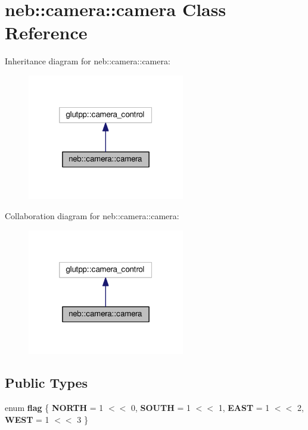 \hypertarget{classneb_1_1camera_1_1camera}{\section{neb\-:\-:camera\-:\-:camera Class Reference}
\label{classneb_1_1camera_1_1camera}
}


Inheritance diagram for neb\-:\-:camera\-:\-:camera\-:
\nopagebreak
\begin{figure}[H]
\begin{center}
\leavevmode
\includegraphics[width=194pt]{classneb_1_1camera_1_1camera__inherit__graph}
\end{center}
\end{figure}


Collaboration diagram for neb\-:\-:camera\-:\-:camera\-:
\nopagebreak
\begin{figure}[H]
\begin{center}
\leavevmode
\includegraphics[width=194pt]{classneb_1_1camera_1_1camera__coll__graph}
\end{center}
\end{figure}
\subsection*{Public Types}
\begin{DoxyCompactItemize}
\item 
enum {\bfseries flag} \{ {\bfseries N\-O\-R\-T\-H} = 1 $<$$<$ 0, 
{\bfseries S\-O\-U\-T\-H} = 1 $<$$<$ 1, 
{\bfseries E\-A\-S\-T} = 1 $<$$<$ 2, 
{\bfseries W\-E\-S\-T} = 1 $<$$<$ 3
 \}
\end{DoxyCompactItemize}
